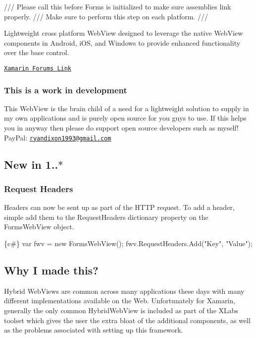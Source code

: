 /// Please call this before Forms is initialized to make sure assemblies link properly. /// Make sure to perform this step on each platform. /// 

Lightweight cross platform Web\+View designed to leverage the native Web\+View components in Android, i\+OS, and Windows to provide enhanced functionality over the base control.

\href{https://forums.xamarin.com/discussion/87935/new-simple-webview-plugin-for-forms}{\tt Xamarin Forums Link}

\subsubsection*{This is a work in development}

This Web\+View is the brain child of a need for a lightweight solution to supply in my own applications and is purely open source for you guys to use. If this helps you in anyway then please do support open source developers such as myself! Pay\+Pal\+: \href{mailto:ryandixon1993@gmail.com}{\tt ryandixon1993@gmail.\+com}

\subsection*{New in 1..$\ast$}

\subsubsection*{Request Headers}

Headers can now be sent up as part of the H\+T\+TP request. To add a header, simple add them to the Request\+Headers dictionary property on the Forms\+Web\+View object. 
\begin{DoxyCode}
\{c#\}
var fwv = new FormsWebView();
fwv.RequestHeaders.Add("Key", "Value");
\end{DoxyCode}


\subsection*{Why I made this?}

Hybrid Web\+Views are common across many applications these days with many different implementations available on the Web. Unfortunately for Xamarin, generally the only common Hybrid\+Web\+View is included as part of the X\+Labs toolset which gives the user the extra bloat of the additional components, as well as the problems associated with setting up this framework.

